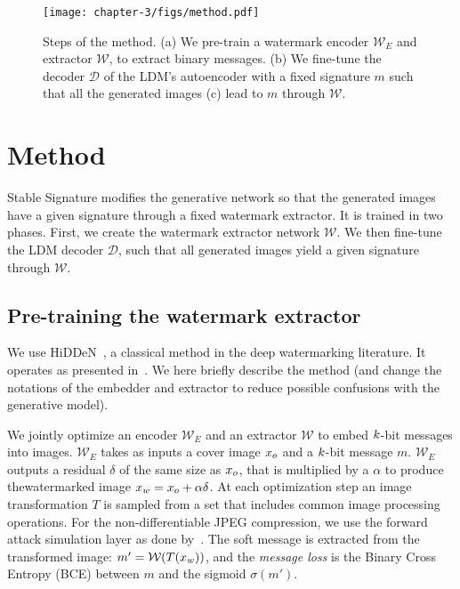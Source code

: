 
\begin{figure}[b!]
    \centering
    \texttt{[image: chapter-3/figs/method.pdf]}
    \caption{
        Steps of the method.
        (a) We pre-train a watermark encoder $\mathcal{W}_E$ and extractor $\mathcal{W}$, to extract binary messages.
        (b) We fine-tune the decoder $\mathcal{D}$ of the LDM's autoencoder with a fixed signature $m$ such that all the generated images (c) lead to $m$ through $\mathcal{W}$.
        }
    \label{chap3/fig:method}
\end{figure}

\section{Method}

Stable Signature modifies the generative network so that the generated images have a given signature through a fixed watermark extractor.
It is trained in two phases.
First, we create the watermark extractor network $\mathcal{W}$.
We then fine-tune the LDM decoder $\mathcal{D}$, such that all generated images yield a given signature through $\mathcal{W}$.

\subsection{Pre-training the watermark extractor}\label{chap3/subsec:pre-training}

We use \Gls*{HiDDeN}~\citep{zhu2018hidden}, a classical method in the deep watermarking literature.
It operates as presented in~.
We here briefly describe the method (and change the notations of the embedder and extractor to reduce possible confusions with the generative model).

We jointly optimize an encoder $\mathcal{W}_E$ and an extractor $\mathcal{W}$ to embed $k$-bit messages into images. 
$\mathcal{W}_E$ takes as inputs a cover image $x_o$ and a $k$-bit message $m$.
$\mathcal{W}_E$ outputs a residual $\delta$ of the same size as $x_o$, that is multiplied by a $\alpha$ to produce thewatermarked image $x_w = x_o + \alpha \delta$.
At each optimization step an image transformation $T$ is sampled from a set that includes common image processing operations. 
For the non-differentiable JPEG compression, we use the forward attack simulation layer as done by~\cite{zhang2021asl}. 
The soft message is extracted from the transformed image: $m' = \mathcal{W}(T(x_w))$, and the \emph{message loss} is the Binary Cross Entropy (BCE) between $m$ and the sigmoid $\sigma (m')$.

